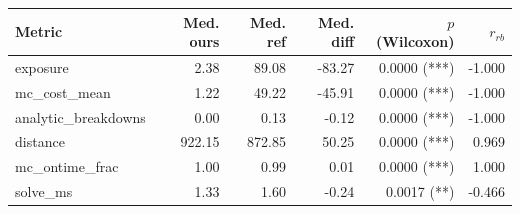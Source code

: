 \begin{tabular}{lrrrrr}
\toprule
Metric & Med. ours & Med. ref & Med. diff & $p$ (Wilcoxon) & $r_{rb}$ \\
\midrule
exposure & 2.38 & 89.08 & -83.27 & 0.0000 (***) & -1.000 \\
mc_cost_mean & 1.22 & 49.22 & -45.91 & 0.0000 (***) & -1.000 \\
analytic_breakdowns & 0.00 & 0.13 & -0.12 & 0.0000 (***) & -1.000 \\
distance & 922.15 & 872.85 & 50.25 & 0.0000 (***) & 0.969 \\
mc_ontime_frac & 1.00 & 0.99 & 0.01 & 0.0000 (***) & 1.000 \\
solve_ms & 1.33 & 1.60 & -0.24 & 0.0017 (**) & -0.466 \\
\bottomrule
\end{tabular}

